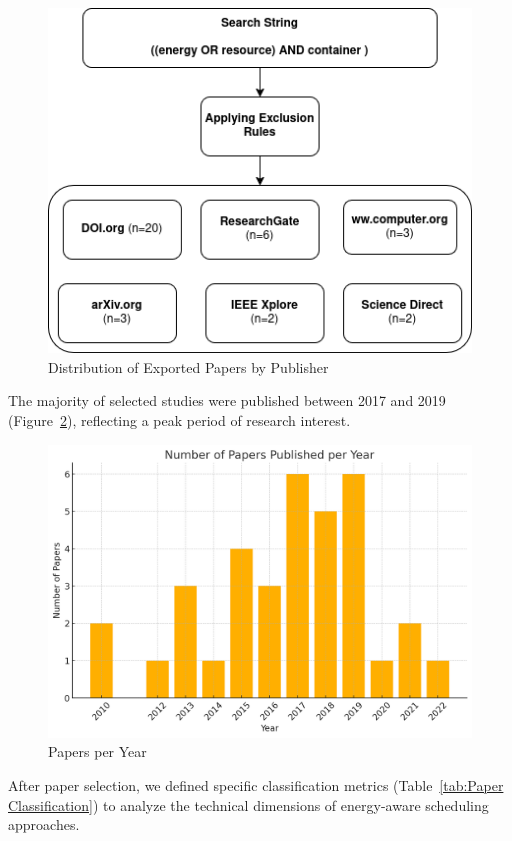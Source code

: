 \begin{multicols}{2}
\begin{figure}[H]
    \centering
    \includegraphics[width=\columnwidth]{sections/exportedPapers.png}
    \caption{Distribution of Exported Papers by Publisher}
    \label{fig:exported_papers}
\end{figure}

The majority of selected studies were published between 2017 and 2019 (Figure~\ref{fig:papers_per_year}), reflecting a peak period of research interest.

\begin{figure}[H]
    \centering
    \includegraphics[width=0.8\columnwidth]{papers_per_year.png}
    \caption{Papers per Year}
    \label{fig:papers_per_year}
\end{figure}

After paper selection, we defined specific classification metrics (Table~\ref{tab:Paper Classification}) to analyze the technical dimensions of energy-aware scheduling approaches.


\end{multicols}
